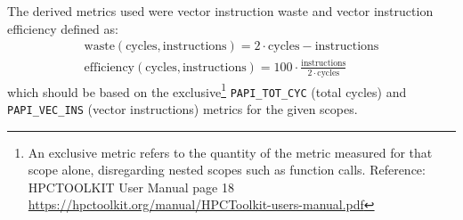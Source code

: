 \documentclass[a4paper, 11pt]{memoir}
\begin{document}
    The derived metrics used were vector instruction waste and vector instruction efficiency defined as:
    \begin{align}
        \text{waste}(\text{cycles}, \text{instructions}) = 2 \cdot \text{cycles} - \text{instructions} \label{eq:vec_waste}\\
        \text{efficiency}(\text{cycles}, \text{instructions}) = 100 \cdot \frac{\text{instructions}}{2\cdot\text{cycles}}
        \label{eq:vec_efficiency}
    \end{align}
    which should be based on the exclusive\footnote{An exclusive metric refers to the quantity of the metric measured
    for that scope alone, disregarding nested scopes such as function calls. Reference: HPCTOOLKIT User Manual page 18
    \href{https://hpctoolkit.org/manual/HPCToolkit-users-manual.pdf}{https://hpctoolkit.org/manual/HPCToolkit-users-manual.pdf}}
    \texttt{PAPI_TOT_CYC} (total cycles) and \texttt{PAPI_VEC_INS}
    (vector instructions) metrics for the given scopes.


% 
\end{document}
